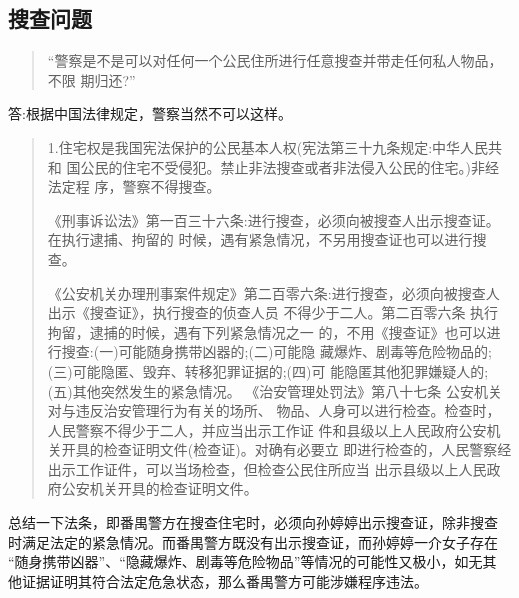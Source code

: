 \documentclass{ctexart}
\begin{document}
\subsection{搜查问题}
\begin{quotation}
  “警察是不是可以对任何一个公民住所进行任意搜查并带走任何私人物品，不限 期归还?”
\end{quotation}\par
答:根据中国法律规定，警察当然不可以这样。
\begin{quotation}
  1.住宅权是我国宪法保护的公民基本人权(宪法第三十九条规定:中华人民共和 国公民的住宅不受侵犯。禁止非法搜查或者非法侵入公民的住宅。)非经法定程 序，警察不得搜查。\par
  《刑事诉讼法》第一百三十六条:进行搜查，必须向被搜查人出示搜查证。在执行逮捕、拘留的 时候，遇有紧急情况，不另用搜查证也可以进行搜查。\par
  《公安机关办理刑事案件规定》第二百零六条:进行搜查，必须向被搜查人出示《搜查证》，执行搜查的侦查人员 不得少于二人。第二百零六条 执行拘留，逮捕的时候，遇有下列紧急情况之一 的，不用《搜查证》也可以进行搜查:(一)可能随身携带凶器的;(二)可能隐 藏爆炸、剧毒等危险物品的;(三)可能隐匿、毁弃、转移犯罪证据的;(四)可 能隐匿其他犯罪嫌疑人的;(五)其他突然发生的紧急情况。
  《治安管理处罚法》第八十七条 公安机关对与违反治安管理行为有关的场所、 物品、人身可以进行检查。检查时，人民警察不得少于二人，并应当出示工作证 件和县级以上人民政府公安机关开具的检查证明文件(检查证)。对确有必要立 即进行检查的，人民警察经出示工作证件，可以当场检查，但检查公民住所应当 出示县级以上人民政府公安机关开具的检查证明文件。
\end{quotation}\par
总结一下法条，即番禺警方在搜查住宅时，必须向孙婷婷出示搜查证，除非搜查 时满足法定的紧急情况。而番禺警方既没有出示搜查证，而孙婷婷一介女子存在 “随身携带凶器”、“隐藏爆炸、剧毒等危险物品”等情况的可能性又极小，如无其 他证据证明其符合法定危急状态，那么番禺警方可能涉嫌程序违法。
\end{document}
